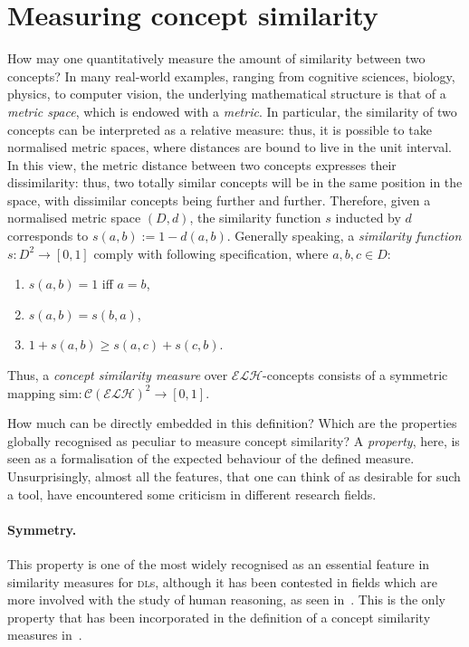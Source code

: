 \documentclass[]{llncs}
\newcommand{\elh}{\(\mathcal{ELH}{}\)}
\newcommand{\dl}{\textsc{dl}}
\begin{document}
  \section{Measuring concept similarity}

  How may one quantitatively measure the amount of similarity between two concepts?
  In many real-world examples, ranging from cognitive sciences, biology, physics, to computer vision, the underlying mathematical structure is that of a \emph{metric space}, which is endowed with a \emph{metric}.
  In particular, the similarity of two concepts can be interpreted as a relative measure: thus, it is possible to take normalised metric spaces, where distances are bound to live in the unit interval.
  In this view, the metric distance between two concepts expresses their dissimilarity: thus, two totally similar concepts will be in the same position in the space, with dissimilar concepts being further and further.
  Therefore, given a normalised metric space \((D,d)\), the similarity function \(s\) inducted by \(d\) corresponds to \(s(a,b) := 1 - d(a,b)\).
  Generally speaking, a \emph{similarity function} \(s \colon D^2 \to [0,1]\) comply with following specification, where \(a,b,c \in D\):
  \begin{enumerate}
    \item \(s(a,b) = 1\) iff \(a = b\),
    \item \(s(a,b) = s(b,a)\),
    \item \(1 + s(a,b) \ge s(a,c) + s(c,b)\).
  \end{enumerate}

  Thus, a \emph{concept similarity measure} over \elh-concepts consists of a symmetric mapping \(\mathrm{sim} \colon {\mathcal{C}(\mathcal{ELH})}^2 \to [0,1]\).

  How much can be directly embedded in this definition?
  Which are the properties globally recognised as peculiar to measure concept similarity?
  A \emph{property}, here, is seen as a formalisation of the expected behaviour of the defined measure.
  Unsurprisingly, almost all the features, that one can think of as desirable for such a tool, have encountered some criticism in different research fields.

  \paragraph{Symmetry.} This property is one of the most widely recognised as an essential feature in similarity measures for \dl{}s, although it has been contested in fields which are more involved with the study of human reasoning, as seen in~\cite{Tve77}.
  This is the only property that has been incorporated in the definition of a concept similarity measures in~\cite{LeTu12}.
\end{document}
